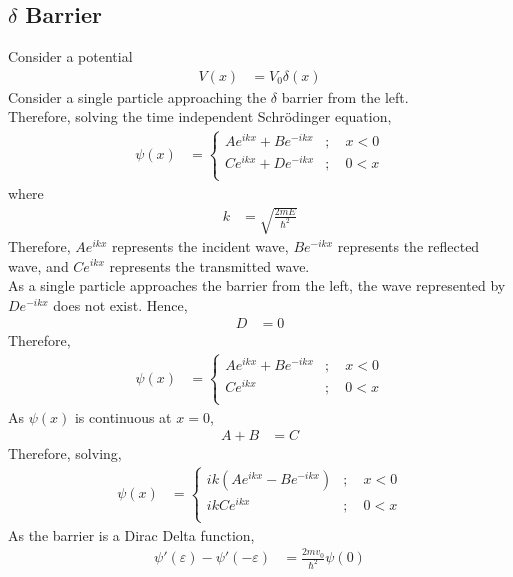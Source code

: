 \documentclass[titlepage, fleqn, a4paper, 12pt, twoside]{article}
\theoremstyle{definition}
\theoremstyle{theorem}
\let\Oldsubsection\subsection
\renewcommand{\subsection}{\FloatBarrier\Oldsubsection}
\begin{document}
\subsection{$\delta$ Barrier}

Consider a potential
\begin{align*}
	V(x) &= V_0 \delta(x)
\end{align*}
Consider a single particle approaching the $\delta$ barrier from the left.\\
Therefore, solving the time independent Schrödinger equation,
\begin{align*}
	\psi(x) &=
		\begin{cases}
			A e^{i k x} + B e^{-i k x} &;\quad x < 0\\
			C e^{i k x} + D e^{-i k x} &;\quad 0 < x\\
		\end{cases}
\end{align*}
where
\begin{align*}
	k &= \sqrt{\frac{2 m E}{\hbar^2}}
\end{align*}
Therefore, $A e^{i k x}$ represents the incident wave, $B e^{-i k x}$ represents the reflected wave, and $C e^{i k x}$ represents the transmitted wave.\\
As a single particle approaches the barrier from the left, the wave represented by $D e^{-i k x}$ does not exist.
Hence,
\begin{align*}
	D &= 0
\end{align*}
Therefore,
\begin{align*}
	\psi(x) &=
		\begin{cases}
			A e^{i k x} + B e^{-i k x} &;\quad x < 0\\
			C e^{i k x} &;\quad 0 < x\\
		\end{cases}
\end{align*}
As $\psi(x)$ is continuous at $x = 0$,
\begin{align*}
	A + B &= C
\end{align*}
Therefore, solving,
\begin{align*}
	\psi(x) &=
		\begin{cases}
			i k \left( A e^{i k x} - B e^{-i k x} \right) &;\quad x < 0\\
			i k C e^{i k x} &;\quad 0 < x\\
		\end{cases}
\end{align*}
As the barrier is a Dirac Delta function,
\begin{align*}
	\psi'(\varepsilon) - \psi'(-\varepsilon) &= \frac{2 m v_0}{\hbar^2} \psi(0)
\end{align*}
\end{document}
